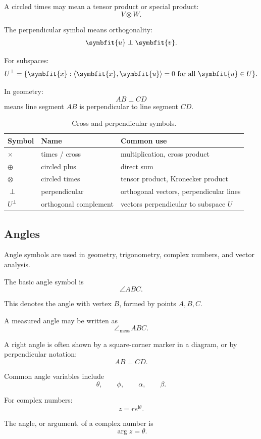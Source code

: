 \documentclass[11pt,twocolumn]{article}
\newcommand{\safeangle}{\angle}
\newcommand{\safemeasuredangle}{\angle_{\mathrm{meas}}}
\newcommand{\vct}[1]{\symbfit{#1}}   %
\newcommand{\inner}[2]{\left\langle #1, #2 \right\rangle}
\newcommand{\ii}{\mathrm{i}}
\begin{document}
A circled times may mean a tensor product or special product:
\[
V \otimes W.
\]

The perpendicular symbol means orthogonality:
\[
\vct{u}\perp\vct{v}.
\]

For subspaces:
\[
U^\perp
=
\{\vct{x}:\inner{\vct{x}}{\vct{u}}=0
\text{ for all } \vct{u}\in U\}.
\]

In geometry:
\[
AB \perp CD
\]
means line segment \(AB\) is perpendicular to line segment \(CD\).

\begin{table}[ht]
\centering
\small
\caption{Cross and perpendicular symbols.}
\begin{tabular}{lll}
\toprule
Symbol & Name & Common use \\
\midrule
$\times$ & times / cross & multiplication, cross product \\
$\oplus$ & circled plus & direct sum \\
$\otimes$ & circled times & tensor product, Kronecker product \\
$\perp$ & perpendicular & orthogonal vectors, perpendicular lines \\
$U^\perp$ & orthogonal complement & vectors perpendicular to subspace \(U\) \\
\bottomrule
\end{tabular}
\end{table}

\subsection{Angles}

Angle symbols are used in geometry, trigonometry, complex numbers, and vector
analysis.

The basic angle symbol is
\[
\safeangle ABC.
\]

This denotes the angle with vertex \(B\), formed by points \(A,B,C\).

A measured angle may be written as
\[
\safemeasuredangle ABC.
\]

A right angle is often shown by a square-corner marker in a diagram, or by
perpendicular notation:
\[
AB \perp CD.
\]

Common angle variables include
\[
\theta,
\qquad
\phi,
\qquad
\alpha,
\qquad
\beta.
\]

For complex numbers:
\[
z = r e^{\ii\theta}.
\]

The angle, or argument, of a complex number is
\[
\arg z = \theta.
\]
\end{document}
